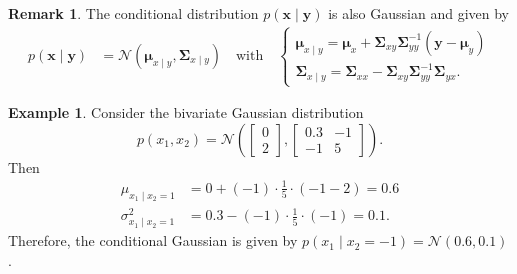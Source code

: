\documentclass[12pt,openany]{book}
\theoremstyle{definition}
\newtheorem{remark}{Remark}[chapter]
\newtheorem{example}{Example}[chapter]
\newcommand{\of}[1]{\left( #1 \right)}
\newcommand{\mvec}[1]{\boldsymbol{#1}}
\renewcommand{\vec}[1]{\textbf{#1}}
\begin{document}
	\begin{remark}
		The conditional distribution $p(\vec{x}\mid\vec{y})$ is also Gaussian and given by \begin{align*}
			p(\vec{x}\mid\vec{y}) &= \mathcal{N}(\mvec{\mu}_{x\mid y},\mvec{\Sigma}_{x\mid y})\quad\text{with}\quad
			\begin{cases}
				\mvec{\mu}_{x\mid y}=\mvec{\mu}_x+\mvec{\Sigma}_{xy}\mvec{\Sigma}_{yy}^{-1}(\vec{y}-\mvec{\mu}_y)\\
				\mvec{\Sigma}_{x\mid y}=\mvec{\Sigma}_{xx}-\mvec{\Sigma}_{xy}\mvec{\Sigma}_{yy}^{-1}\mvec{\Sigma}_{yx}.
			\end{cases}
		\end{align*}
	\end{remark}
	\vspace{12pt}
	\begin{example}
		Consider the bivariate Gaussian distribution \[
		p(x_1,x_2)=\mathcal{N}\of{\begin{bmatrix}
				0\\ 2
		\end{bmatrix},\begin{bmatrix}
		0.3 & -1\\ -1 & 5
	\end{bmatrix}}.
		\] Then \begin{align*}
			\mu_{x_1\mid x_2=1}&=0+(-1)\cdot\frac{1}{5}\cdot(-1-2)=0.6\\
			\sigma_{x_1\mid x_2=1}^2&=0.3-(-1)\cdot\frac{1}{5}\cdot(-1)=0.1.
		\end{align*} Therefore, the conditional Gaussian is given by $p(x_1\mid x_2=-1)=\mathcal{N}(0.6,0.1)$.
	\end{example} 
\end{document}
